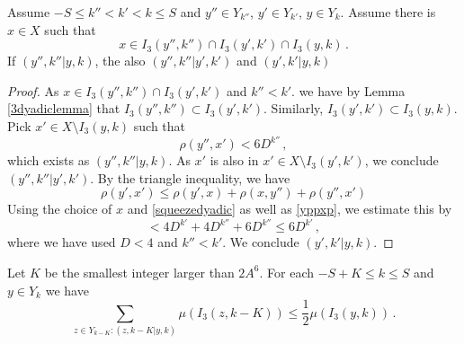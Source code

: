 \begin{lemma}\label{bdtrans}
Assume $-S\le k''< k'< k\le S$ and
$y''\in Y_{k''}$, $y'\in Y_{k'}$, $y\in Y_k$.
Assume there is $x\in X$ such that
\begin{equation}
x\in I_3(y'',k'')\cap I_3(y',k')\cap I_3(y,k)\, .
\end{equation}
If $(y'',k''|y,k)$, the also
$(y'',k''|y',k')$ and $(y',k'|y,k)$
\end{lemma}

\begin{proof}
As $x\in I_3(y'',k'')\cap I_3(y',k')$ and $k''< k'$.
we have by Lemma \ref{3dyadiclemma} that
$I_3(y'',k'')\subset I_3(y',k')$. Similarly,
$I_3(y',k')\subset I_3(y,k)$.
Pick $x'\in X\setminus I_3(y,k)$ such that
\begin{equation}\label{yppxp}
    \rho(y'',x')< 6D^{k''}\, ,
\end{equation}
which exists as $(y'',k''|y,k)$. As $x'$ is also in
$x'\in X\setminus I_3(y',k')$, we conclude
$(y'',k''|y',k')$.
By the triangle inequality, we have
\begin{equation}
\rho(y',x')\le  \rho(y',x)+\rho(x,y'')+\rho(y'',x')
\end{equation}
Using the choice of $x$ and \eqref{squeezedyadic}
as well as \eqref{yppxp}, we estimate this by
\begin{equation}
<  4D^{k'}+4D^{k''}+6D^{k''}\le 6D^{k'}\, ,
\end{equation}
where we have used $D<4$ and $k''<k'$.
We conclude $(y',k'|y,k)$.
\end{proof}

\begin{lemma}\label{david}
 Let $K$ be the smallest integer larger than
 $2A^6$. For each $-S+K\le k\le S$ and $y\in Y_k$ we have
    \begin{equation}
        \label{new small boundary}
        \sum_{z\in Y_{k-K}: (z,k-K|y,k)}\mu(I_3(z,k-K)) \le \frac 12 \mu(I_3(y,k))\,.
    \end{equation}
\end{lemma}

